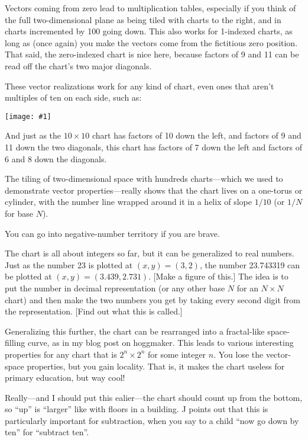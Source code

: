 \documentclass[12pt,pdftex]{article}
\newcommand{\showchart}[1]{\texttt{[image: \#1]}}
\begin{document}
Vectors coming from zero lead to multiplication tables, especially if
you think of the full two-dimensional plane as being tiled with charts
to the right, and in charts incremented by 100 going down.  This also
works for 1-indexed charts, as long as (once again) you make the
vectors come from the fictitious zero position.  That said, the
zero-indexed chart is nice here, because factors of 9 and 11 can be
read off the chart's two major diagonals.

These vector realizations work for any kind of chart, even ones that
aren't multiples of ten on each side, such as:
\begin{center}
\showchart{hundreds_chart_7x7_base10.pdf}
\end{center}
And just as the $10\times 10$ chart has factors of 10 down the left,
and factors of 9 and 11 down the two diagonals, this chart has factors
of 7 down the left and factors of 6 and 8 down the diagonals.

The tiling of two-dimensional space with hundreds charts---which we
used to demonstrate vector properties---really shows that the chart
lives on a one-torus or cylinder, with the number line wrapped around
it in a helix of slope $1/10$ (or $1/N$ for base $N$).

You can go into negative-number territory if you are brave.

The chart is all about integers so far, but it can be generalized to
real numbers.  Just as the number 23 is plotted at $(x,y) = (3,2)$,
the number 23.743319 can be plotted at $(x,y) = (3.439, 2.731)$.
[Make a figure of this.]  The idea is to put the number in decimal
representation (or any other base $N$ for an $N\times N$ chart) and
then make the two numbers you get by taking every second digit from
the representation.  [Find out what this is called.]

Generalizing this further, the chart can be rearranged into a
fractal-like space-filling curve, as in my blog post on hoggmaker.
This leads to various interesting properties for any chart that is
$2^n\times 2^n$ for some integer $n$.  You lose the vector-space
properties, but you gain locality.  That is, it makes the chart
useless for primary education, but way cool!

Really---and I should put this ealier---the chart should count up from
the bottom, so ``up'' is ``larger'' like with floors in a building.  J
points out that this is particularly important for subtraction, when
you say to a child ``now go down by ten'' for ``subtract ten''.
\end{document}
